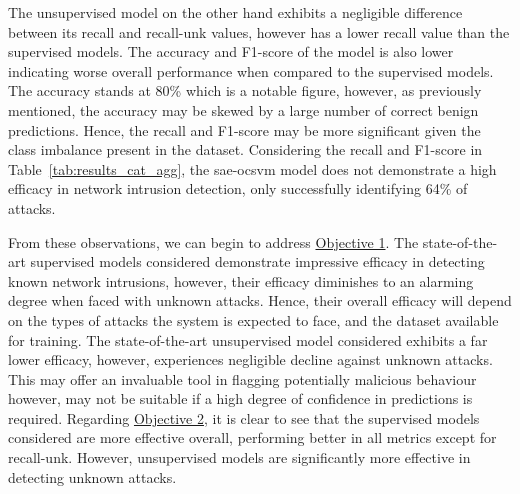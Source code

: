 The unsupervised model on the other hand exhibits a negligible difference
between its recall and recall-unk values, however has a lower recall value than
the supervised models. The accuracy and F1-score of the model is also lower
indicating worse overall performance when compared to the supervised models.
The accuracy stands at 80\% which is a notable figure, however, as previously
mentioned, the accuracy may be skewed by a large number of correct benign
predictions. Hence, the recall and F1-score may be more significant given the
class imbalance present in the dataset. Considering the recall and F1-score in
Table~\ref{tab:results_cat_agg}, the \gls{sae}-\gls{ocsvm} model does not
demonstrate a high efficacy in network intrusion detection, only successfully
identifying 64\% of attacks.

From these observations, we can begin to address \hyperlink{obj}{Objective 1}.
The state-of-the-art supervised models considered demonstrate impressive
efficacy in detecting known network intrusions, however, their efficacy
diminishes to an alarming degree when faced with unknown attacks. Hence, their
overall efficacy will depend on the types of attacks the system is expected to
face, and the dataset available for training. The state-of-the-art unsupervised
model considered exhibits a far lower efficacy, however, experiences negligible
decline against unknown attacks. This may offer an invaluable tool in flagging
potentially malicious behaviour however, may not be suitable if a high degree
of confidence in predictions is required. Regarding \hyperlink{obj}{Objective
    2}, it is clear to see that the supervised models considered are more effective
overall, performing better in all metrics except for recall-unk. However,
unsupervised models are significantly more effective in detecting unknown
attacks.

